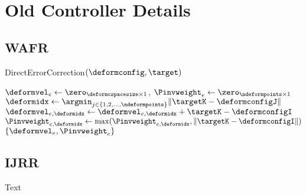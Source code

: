 \chapter{Old Controller Details}

\section{WAFR}

\begin{algorithm}[t]
    \caption{DirectErrorCorrection$(\deformconfig, \target)$}
    \begin{algorithmic}[1]
        \State $\deformvel_e \gets \zero_{\deformcspacesize \times 1}$, $\Pinvweight_e \gets \zero_{\ndeformpoints \times 1}$
            \State $\deformidx \gets \argmin_{j \in \{ 1, 2, \dots, \ndeformpoints \}} \| \targetK - \deformconfigJ \|$
            \State $\deformvel_{e,\deformidx} \gets \deformvel_{e,\deformidx} + \targetK - \deformconfigI$
            \State $\Pinvweight_{e,\deformidx} \gets \max (\Pinvweight_{e,\deformidx}, \| \targetK - \deformconfigI \|)$
        \EndFor
        \State \Return $\{ \deformvel_e, \Pinvweight_e \}$
    \end{algorithmic}
    \label{alg:direct_error_correction_wafr}
\end{algorithm}


\section{IJRR}

Text